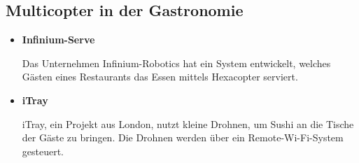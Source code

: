   \subsection*{Multicopter in der Gastronomie}
  \begin{itemize}
      \item \textbf{{Infinium-Serve\cite{infiniumserve}}}

      Das Unternehmen Infinium-Robotics hat ein System entwickelt, welches Gästen eines Restaurants
      das Essen mittels Hexacopter serviert.

      \item \textbf{iTray}

      {iTray\cite{itray}}, ein Projekt aus London, nutzt kleine Drohnen, um Sushi an die Tische der Gäste zu bringen.
      Die Drohnen werden über ein Remote-Wi-Fi-System gesteuert.

  \end{itemize}

